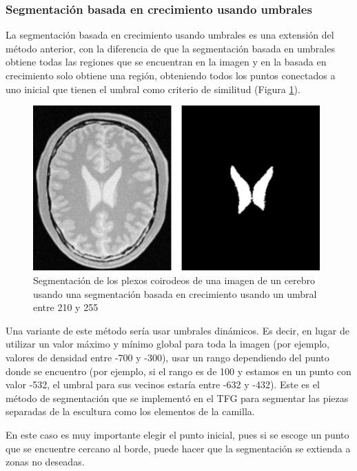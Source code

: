 \subsubsection{Segmentación basada en crecimiento usando umbrales}

La segmentación basada en crecimiento usando umbrales es una extensión del método anterior, con la diferencia de que la segmentación basada en umbrales obtiene todas las regiones que se encuentran en la imagen y en la basada en crecimiento solo obtiene una región, obteniendo todos los puntos conectados a uno inicial que tienen el umbral como criterio de similitud \cite{haralick85} (Figura \ref{fig:desarrollo/segmentacion-crecimiento-umbral}).

\begin{figure}[H]
	\centering
	\includegraphics[width=11cm]{imagenes/desarrollo/segmentacion-crecimiento-umbral}
	\caption{Segmentación de los plexos coirodeos de una imagen de un cerebro usando una segmentación basada en crecimiento usando un umbral entre 210 y 255}
	\label{fig:desarrollo/segmentacion-crecimiento-umbral}
\end{figure}

Una variante de este método sería usar umbrales dinámicos. Es decir, en lugar de utilizar un valor máximo y mínimo global para toda la imagen (por ejemplo, valores de densidad entre -700 y -300), usar un rango dependiendo del punto donde se encuentro (por ejemplo, si el rango es de 100 y estamos en un punto con valor -532, el umbral para sus vecinos estaría entre -632 y -432). Este es el método de segmentación que se implementó en el TFG para segmentar las piezas separadas de la escultura como los elementos de la camilla.

En este caso es muy importante elegir el punto inicial, pues si se escoge un punto que se encuentre cercano al borde, puede hacer que la segmentación se extienda a zonas no deseadas.

